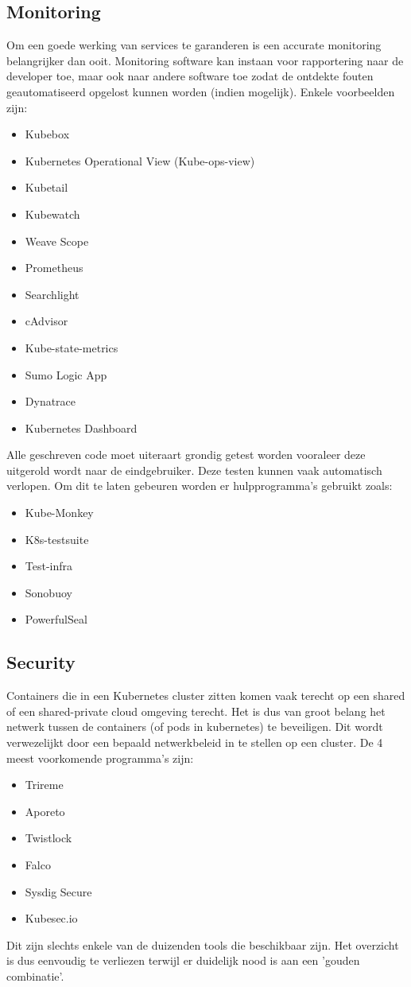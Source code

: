 \subsection{Monitoring}
Om een goede werking van services te garanderen is een accurate monitoring belangrijker dan ooit. Monitoring software kan instaan voor rapportering naar de developer toe, maar ook naar andere software toe zodat de ontdekte fouten geautomatiseerd opgelost kunnen worden (indien mogelijk). Enkele voorbeelden zijn:
\begin{itemize}
    \item Kubebox
    \item Kubernetes Operational View (Kube-ops-view)
    \item Kubetail
    \item Kubewatch
    \item Weave Scope
    \item Prometheus
    \item Searchlight
    \item cAdvisor
    \item Kube-state-metrics
    \item Sumo Logic App
    \item Dynatrace
    \item Kubernetes Dashboard
\end{itemize}
Alle geschreven code moet uiteraart grondig getest worden vooraleer deze uitgerold wordt naar de eindgebruiker. Deze testen kunnen vaak automatisch verlopen. Om dit te laten gebeuren worden er hulpprogramma's gebruikt zoals:
\begin{itemize}
    \item Kube-Monkey
    \item K8s-testsuite
    \item Test-infra
    \item Sonobuoy
    \item PowerfulSeal
\end{itemize}
\subsection{Security}
Containers die in een Kubernetes cluster zitten komen vaak terecht op een shared of een shared-private cloud omgeving terecht. Het is dus van groot belang het netwerk tussen de containers (of pods in kubernetes) te beveiligen. Dit wordt verwezelijkt door een bepaald netwerkbeleid in te stellen op een cluster. De 4 meest voorkomende programma's zijn:
\begin{itemize}
    \item Trireme
    \item Aporeto
    \item Twistlock
    \item Falco
    \item Sysdig Secure
    \item Kubesec.io
\end{itemize}  
Dit zijn slechts enkele van de duizenden tools die beschikbaar zijn. Het overzicht is dus eenvoudig te verliezen terwijl er duidelijk nood is aan een 'gouden combinatie'.

